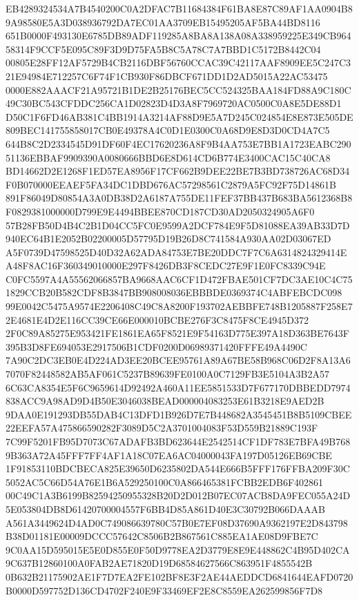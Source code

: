 \documentclass[UTF8,fontset=fandol,zihao=-4,a4paper]{ctexart}
\begin{document}
{{EB4289324534A7B4540200C0A2DFAC7B11684384F61BA8E87C89AF1AA0904B89A98580E5A3D038936792DA7EC01AA3709EB15495205AF5BA44BD8116
651B0000F493130E6785DB89ADF119285A8BA8A138A08A338959225E349CB96458314F9CCF5E095C89F3D9D75FA5B8C5A78C7A7BBD1C5172B8442C04
00805E28FF12AF5729B4CB2116DBF56760CCAC39C42117AAF8909EE5C247C321E94984E712257C6F74F1CB930F86DBCF671DD1D2AD5015A22AC53475
0000E882AAACF21A95721B1DE2B25176BEC5CC524325BAA184FD88A9C180C49C30BC543CFDDC256CA1D02823D4D3A8F7969720AC0500C0A8E5DE88D1
D50C1F6FD46AB381C4BB1914A3214AF88D9E5A7D245C024854E8E873E505DE809BEC141755858017CB0E49378A4C0D1E0300C0A68D9E8D3D0CD4A7C5
644B8C2D2334545D91DF60F4EC17620236A8F9B4AA753E7BB1A1723EABC29051136EBBAF9909390A0080666BBD6E8D614CD6B774E3400CAC15C40CA8
BD14662D2E1268F1ED57EA8956F17CF662B9DEE22BE7B3BD738726AC68D34F0B070000EEAEF5FA34DC1DBD676AC57298561C2879A5FC92F75D14861B
891F86049D80854A3A0DB38D2A6187A755DE11FEF37BB437B683BA5612368B8F0829381000000D799E9E4494BBEE870CD187CD30AD2050324905A6F0
57B28FB50D4B4C2B1D04CC5FC0E9599A2DCF784E9F5D81088EA39AB33D7D940EC64B1E2052B02200005D57795D19B26D8C741584A930AA02D03067ED
A5F0739D47598525D40D32A62ADA84753E7BE20DDC7F7C6A6314824329414EA48F8AC16F360349010000E297F8426DB3F8CEDC27E9F1E0FC8339C94E
C0FC5597A4A55562066857BA9668AAC6CF1D472FBAE501CF7DC3AE10C4C751829CCB20B582CDF8B3847BB908008036EBBBDE0369374C4ABFEBCDC098
99E0042C5475A9574E2206408C49C8A8200F193702AEBBFE748B1205887F258E72E4681E4D2E116CC39CE66E000010BCBE276F3C8475F8CE4945D372
2F0C89A85275E953421FE1861EA65F8521E9F54163D775E397A18D363BE7643F395B3D8FE694053E2917506B1CDF0200D06989371420FFFE49A4490C
7A90C2DC3EB0E4D224AD3EE20BCEE95761A89A67BE58B968C06D2F8A13A67070F82448582AB5AF061C5237B89639FE0100A0C7129FB3E5104A3B2A57
6C63CA8354E5F6C9659614D92492A460A11EE5851533D7F677170DBBEDD7974838ACC9A98AD9D4B50E3046038BEAD000004083253E61B3218E9AED2B
9DAA0E191293DB55DAB4C13DFD1B926D7E7B448682A3545451B8B5109CBEE22EEFA57A475866590282F3089D5C2A3701004083F53D559B21889C193F
7C99F5201FB95D7073C67ADAFB3BD623644E2542514CF1DF783E7BFA49B7689B363A72A45FFF7FF4AF1A18C07EA6AC04000043FA197D05126EB69CBE
1F91853110BDCBECA825E39650D6235802DA544E666B5FFF176FFBA209F30C5052AC5C66D54A76E1B6A529250100C0A866465381FCBB2EDB6F402861
00C49C1A3B6199B82594250955328B20D2D012B07EC07ACB8DA9FEC055A24D5E053804DB8D61420700004557F6BB4D85A861D40E3C30792B066DAAAB
A561A3449624D4AD0C749086639780C57B0E7EF08D37690A9362197E2D843798B38D01181E00009DCCC57642C8506B2B867561C885EA1AE08D9FBE7C
9C0AA15D595015E5E0D855E0F50D9778EA2D3779E8E9E448862C4B95D402CA9C637B12860100A0FAB2AE71820D19D68584627566C863951F4855542B
0B632B21175902AE1F7D7EA2FE102BF8E3F2AE44AEDDCD6841644EAFD0720B0000D597752D136CD4702F240E9F33469EF2E8C8559EA262599856F7D8
}}
\end{document}
